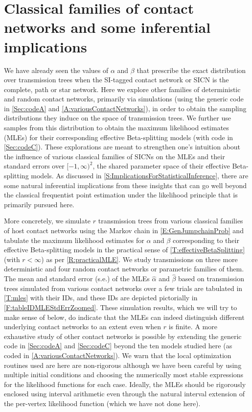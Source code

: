 \documentclass[review]{elsarticle}
\numberwithin{equation}{section}
\let\orgautoref\autoref
\renewcommand{\autoref}
        {\def\equationautorefname{Eq.}%
         \def\figureautorefname{Fig.}%
         \def\subfigureautorefname{Fig.}%
         \def\sectionautorefname{Sect.}%
         \def\subsectionautorefname{Sect.}%
         \def\subsubsectionautorefname{Sect.}%
         \def\Itemautorefname{item}%
         \def\tableautorefname{Table}%
         \def\propositionautorefname{Prop.}%
         \def\corollaryautorefname{Corollary}%
         \def\theoremautorefname{Theorem}%
         \def\remarkautorefname{Remark}%
         \def\lemmaautorefname{Lemma}%
         \def\proofofautorefname{Proof}%
         \def\exampleautorefname{Example}%
         \orgautoref}
\providecommand{\autorefs}
        {\def\equationautorefname{Eqs.}%
         \def\figureautorefname{Figs.}%
         \def\subfigureautorefname{Figs.}%
         \def\sectionautorefname{Sects.}%
         \def\subsectionautorefname{Sects.}%
         \def\subsubsectionautorefname{Sects.}%
         \def\Itemautorefname{items}%
         \def\tableautorefname{Tables}%
         \def\propositionautorefname{Props.}%
         \def\theoremautorefname{Theorems}%
         \def\theoremautorefname{Remarks}%
         \def\lemmaautorefname{Lemmas}%
         \def\proofofautorefname{Proofs}%
         \def\exampleautorefname{Examples}%
         \orgautoref}
\begin{document}
\section{Classical families of contact networks and some inferential implications}\label{S:ClassicalSICNFamilies}

We have already seen the values of $\alpha$ and $\beta$ that prescribe the exact distribution over transmission trees when the SI-tagged contact network or SICN is the complete, path or star network.  
Here we explore other families of deterministic and random contact networks, primarily via simulations 
(using the generic code in \autorefs{Sec:codeA} and \ref{A:variousContactNetworks}), in order to obtain the sampling distributions they induce on the space of transmission trees.  
We further use samples from this distribution to obtain the maximum likelihood estimates (MLEs) for their corresponding effective Beta-splitting models (with code in \autoref{Sec:codeC}).  
These explorations are meant to strengthen one's intuition about the influence of various classical families of SICNs on the MLEs and their standard errors over $[-1,\infty)^2$, the shared parameter space of their effective Beta-splitting models.  
As discussed in \autoref{S:ImplicationsForStatisticalInference}, there are some natural inferential implications from these insights that can go well beyond the classical frequentist point estimation under the likelihood principle that is primarily pursued here.
   
More concretely, we simulate $r$ transmission trees from various classical families of host contact networks using the Markov chain 
in \autoref{E:GenJumpchainProb} and tabulate the maximum likelihood estimates for $\alpha$ and $\beta$ corresponding to their 
effective Beta-splitting models in the practical sense of \autoref{T:effectiveBetaSplitting} (with $r < \infty$) as per \autoref{R:practicalMLE}.  
We study transmissions on three more deterministic and four random contact networks or parametric families of them. 
The mean and standard error (s.e.) of the MLEs $\hat{\alpha}$ and $\hat{\beta}$ based on transmission trees simulated from various contact networks over a few trials are tabulated in \autoref{T:mles} with their IDs, and these IDs are depicted pictorially in \autoref{F:tableIDMLEStdErrZoomed}.  
These simulation results, which we will try to make sense of below, do indicate that the MLEs can indeed distinguish different underlying contact networks to an extent even when $r$ is finite.
A more exhaustive study of other contact networks is possible by extending the generic code in \autorefs{Sec:codeA} and \ref{Sec:codeC} beyond the ten models studied here (as coded in \autoref{A:variousContactNetworks}).  
We warn that the local optimization routines used are here are non-rigorous although we have been careful by using multiple initial conditions and choosing the numerically most stable expressions for the likelihood functions for each case.  
Ideally, the MLEs should be rigorously enclosed using interval arithmetic even through the natural interval extension \citep{HofschusterK03} of the per-vertex likelihood function (which we have not done here). 
\end{document}
